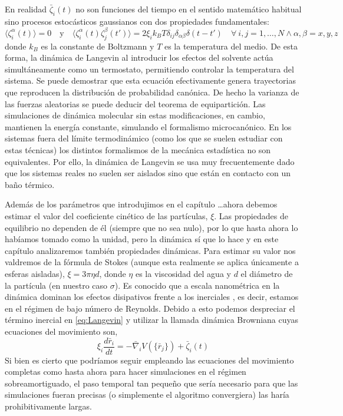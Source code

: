 En realidad $\bar{\zeta}_i(t)$ no son funciones del tiempo en el sentido matemático habitual sino procesos estocásticos gaussianos con dos propiedades fundamentales:
\begin{equation}
    \label{eq:random_forces_properties}
    \langle \zeta_i^\alpha(t) \rangle=0 \quad \text{y} \quad \langle \zeta_i^\alpha(t)\zeta_j^\beta(t') \rangle=2\xi_ik_BT\delta_{ij}\delta_{\alpha\beta}\delta(t-t') \quad \forall \ i,j=1,\dots,N \land \alpha,\beta=x,y,z
\end{equation}
donde $k_B$ es la constante de Boltzmann y $T$ es la temperatura del medio. De esta forma, la dinámica de Langevin al introducir los efectos del solvente actúa simultáneamente como un termostato, permitiendo controlar la temperatura del sistema. Se puede demostrar \cite{Coffey2012} que esta ecuación efectivamente genera trayectorias que reproducen la distribución de probabilidad canónica. De hecho la varianza de las fuerzas aleatorias se puede deducir del teorema de equipartición. Las simulaciones de dinámica molecular sin estas modificaciones, en cambio, mantienen la energía constante, simulando el formalismo microcanónico. En los sistemas fuera del límite termodinámico (como los que se suelen estudiar con estas técnicas) los distintos formalismos de la mecánica estadística no son equivalentes. Por ello, la dinámica de Langevin se usa muy frecuentemente dado que los sistemas reales no suelen ser aislados sino que están en contacto con un baño térmico.

Además de los parámetros que introdujimos en el capítulo \dots ahora debemos estimar el valor del coeficiente cinético de las partículas, $\xi$. Las propiedades de equilibrio no dependen de él (siempre que no sea nulo), por lo que hasta ahora lo habíamos tomado como la unidad, pero la dinámica sí que lo hace y en este capítulo analizaremos también propiedades dinámicas. Para estimar su valor nos valdremos de la fórmula de Stokes (aunque esta realmente se aplica únicamente a esferas aisladas), $\xi=3\pi\eta d$, donde $\eta$ es la viscosidad del agua y $d$ el diámetro de la partícula (en nuestro caso $\sigma$). Es conocido que a escala nanométrica en la dinámica dominan los efectos disipativos frente a los inerciales \cite{Purcell1977}, es decir, estamos en el régimen de bajo número de Reynolds. Debido a esto podemos despreciar el término inercial en \eqref{eq:Langevin} y utilizar la llamada dinámica Browniana cuyas ecuaciones del movimiento son,
\begin{equation}
    \label{eq:Brownian}
    \xi_i\frac{d\bar{r}_i}{dt}=-\bar{\nabla}_iV\left(\{\bar{r}_j\}\right)+\bar{\zeta}_i(t)
\end{equation}
Si bien es cierto que podríamos seguir empleando las ecuaciones del movimiento completas como hasta ahora para hacer simulaciones en el régimen sobreamortiguado, el paso temporal tan pequeño que sería necesario para que las simulaciones fueran precisas (o simplemente el algoritmo convergiera) las haría prohibitivamente largas.

